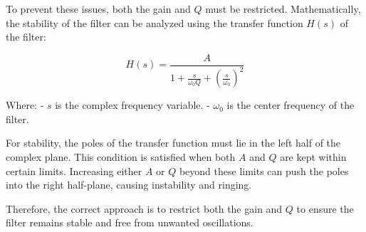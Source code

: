 To prevent these issues, both the gain and \(Q\) must be restricted. Mathematically, the stability of the filter can be analyzed using the transfer function \(H(s)\) of the filter:

\[
H(s) = \frac{A}{1 + \frac{s}{\omega_0 Q} + \left(\frac{s}{\omega_0}\right)^2}
\]

Where:
- \(s\) is the complex frequency variable.
- \(\omega_0\) is the center frequency of the filter.

For stability, the poles of the transfer function must lie in the left half of the complex plane. This condition is satisfied when both \(A\) and \(Q\) are kept within certain limits. Increasing either \(A\) or \(Q\) beyond these limits can push the poles into the right half-plane, causing instability and ringing.

Therefore, the correct approach is to restrict both the gain and \(Q\) to ensure the filter remains stable and free from unwanted oscillations.

